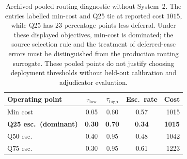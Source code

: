 \begin{table}[!t]
\centering
\caption{Archived pooled routing diagnostic without System~2. The entries labelled min-cost and Q25 tie at reported cost $1015$, while Q25 has $23$ percentage points less deferral. Under these displayed objectives, min-cost is dominated; the source selection rule and the treatment of deferred-case errors must be distinguished from the production routing surrogate. These pooled points do not justify choosing deployment thresholds without held-out calibration and adjudicator evaluation.}
\label{tab:pareto}
\begin{tabular}{lcccr}
\toprule
Operating point & $\tau_{\mathrm{low}}$ & $\tau_{\mathrm{high}}$ & Esc.\ rate & Cost \\
\midrule
Min cost            & 0.05 & 0.60 & 0.57 & 1015 \\
\textbf{Q25 esc.\ (dominant)} & \textbf{0.30} & \textbf{0.70} & \textbf{0.34} & \textbf{1015} \\
Q50 esc.            & 0.40 & 0.95 & 0.48 & 1042 \\
Q75 esc.            & 0.30 & 0.95 & 0.61 & 1223 \\
\bottomrule
\end{tabular}
\end{table}
